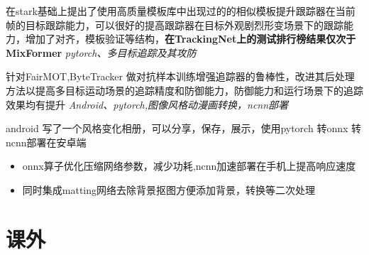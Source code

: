 \documentclass{uniquecv}
\begin{document}
在stark基础上提出了使用高质量模板库中出现过的的相似模板提升跟踪器在当前帧的目标跟踪能力，可以很好的提高跟踪器在目标外观剧烈形变场景下的跟踪能力，增加了对齐，模板验证等结构，\textbf{在TrackingNet上的测试排行榜结果仅次于MixFormer}
\textit{pytorch、多目标追踪及其攻防}
\vspace{0.4ex}

针对FairMOT,ByteTracker 做对抗样本训练增强追踪器的鲁棒性，改进其后处理方法以提高多目标运动场景的追踪精度和防御能力，防御能力和运行场景下的追踪效果均有提升
\textit{Android、pytorch,图像风格动漫画转换，ncnn部署}
\vspace{0.4ex}

android 写了一个风格变化相册，可以分享，保存，展示，使用pytorch 转onnx 转 ncnn部署在安卓端
\begin{itemize}
  \item onnx算子优化压缩网络参数，减少功耗,ncnn加速部署在手机上提高响应速度
  \item 同时集成matting网络去除背景抠图方便添加背景，转换等二次处理
\end{itemize}

\section{课外}
\end{document}
